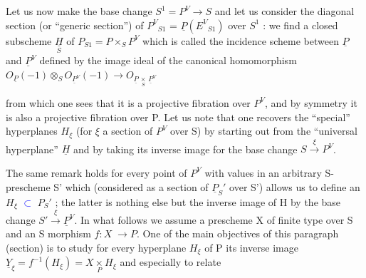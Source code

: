 \documentclass[11pt]{article}
\newcommand{\scanpage}[1]{\par\bigskip\noindent{\small\sffamily[scan #1]}\par}
\newcommand{\mspage}[1]{{\small\sffamily[p.\,#1]}}
\newcommand{\hand}[1]{\textcolor{blue}{#1}}
\begin{document}
Let us now make the base change $S^1 = P^V \to S$ and let us
consider the diagonal section (or ``generic section'') of $P^V{}_{S1}$ =
$\underline{P}(E^V{}_{S1})$ over $S^1$ : we find a closed subscheme $\underset{S}{\underline{H}}$ of $P_{S1} = P \times_S P^V$
which is called the incidence scheme between $\underline{P}$ and $\underline{P}^V$ defined by
the image ideal of the canonical homomorphism
$O_{\underline{P}}(-1) \otimes_S O_{\underline{P}^V}(-1) \to O_{\underline{P}\,\underset{S}{\times}\,\underline{P}^V}$

from which one sees that it is a projective fibration over $P^V$, and
by symmetry it is also a projective fibration over P.  Let us note
that one recovers the ``special'' hyperplanes $H_\xi$ (for $\xi$ a section of
$P^V$ over S) by starting out from the ``universal hyperplane'' $\underline{H}$ and by
taking its inverse image for the base change $S \xrightarrow{\xi} P^V$.

The same remark holds for every point of $P^V$ with values in an
arbitrary S-prescheme S' which (considered as a section of $\underline{P}_S{}'$ over
S') allows us to define an $H_\xi$ \hand{$\subset$} $P_S{}'$ ; the latter is nothing else
but the inverse image of H by the base change $S' \xrightarrow{\xi} \underline{P}^V$.  In what
follows we assume a prescheme X of finite type over S and an S
morphism $f{:}X \;\to P$.  One of the main objectives of this paragraph
(section) is to study for every hyperplane $H_\xi$ of P its inverse
image $\underline{Y}_\xi = f^{-1}(H_\xi) = X \underset{P}{\times} H_\xi$ and especially to relate

\clearpage
\scanpage{24/7}
\mspage{7}
\end{document}
